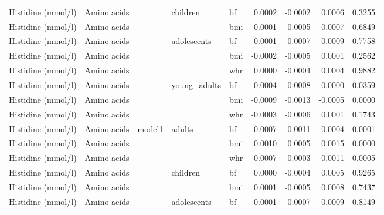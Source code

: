 \documentclass[11pt,twoside]{bristolthesis}
\begin{document}
\begin{longtable}[t]{lllllrrrr}
\cmidrule{1-2}
\cmidrule{5-9}\nopagebreak
Histidine (mmol/l) & Amino acids &  & \multirow{-3}{*}{\raggedright\arraybackslash children} & bf & 0.0002 & -0.0002 & 0.0006 & 0.3255\\
\cmidrule{1-2}
\cmidrule{4-9}\nopagebreak
Histidine (mmol/l) & Amino acids &  &  & bmi & 0.0001 & -0.0005 & 0.0007 & 0.6849\\
\cmidrule{1-2}
\cmidrule{5-9}\nopagebreak
Histidine (mmol/l) & Amino acids &  & \multirow{-2}{*}{\raggedright\arraybackslash adolescents} & bf & 0.0001 & -0.0007 & 0.0009 & 0.7758\\
\cmidrule{1-2}
\cmidrule{4-9}\nopagebreak
Histidine (mmol/l) & Amino acids &  &  & bmi & -0.0002 & -0.0005 & 0.0001 & 0.2562\\
\cmidrule{1-2}
\cmidrule{5-9}\nopagebreak
Histidine (mmol/l) & Amino acids &  &  & whr & 0.0000 & -0.0004 & 0.0004 & 0.9882\\
\cmidrule{1-2}
\cmidrule{5-9}\nopagebreak
Histidine (mmol/l) & Amino acids &  & \multirow{-3}{*}{\raggedright\arraybackslash young\_adults} & bf & -0.0004 & -0.0008 & 0.0000 & 0.0359\\
\cmidrule{1-2}
\cmidrule{4-9}\nopagebreak
Histidine (mmol/l) & Amino acids &  &  & bmi & -0.0009 & -0.0013 & -0.0005 & 0.0000\\
\cmidrule{1-2}
\cmidrule{5-9}\nopagebreak
Histidine (mmol/l) & Amino acids &  &  & whr & -0.0003 & -0.0006 & 0.0001 & 0.1743\\
\cmidrule{1-2}
\cmidrule{5-9}\nopagebreak
Histidine (mmol/l) & Amino acids & \multirow{-11}{*}{\raggedright\arraybackslash model1} & \multirow{-3}{*}{\raggedright\arraybackslash adults} & bf & -0.0007 & -0.0011 & -0.0004 & 0.0001\\
\cmidrule{1-9}\pagebreak[0]
Histidine (mmol/l) & Amino acids &  &  & bmi & 0.0010 & 0.0005 & 0.0015 & 0.0000\\
\cmidrule{1-2}
\cmidrule{5-9}\nopagebreak
Histidine (mmol/l) & Amino acids &  &  & whr & 0.0007 & 0.0003 & 0.0011 & 0.0005\\
\cmidrule{1-2}
\cmidrule{5-9}\nopagebreak
Histidine (mmol/l) & Amino acids &  & \multirow{-3}{*}{\raggedright\arraybackslash children} & bf & 0.0000 & -0.0004 & 0.0005 & 0.9265\\
\cmidrule{1-2}
\cmidrule{4-9}\nopagebreak
Histidine (mmol/l) & Amino acids &  &  & bmi & 0.0001 & -0.0005 & 0.0008 & 0.7437\\
\cmidrule{1-2}
\cmidrule{5-9}\nopagebreak
Histidine (mmol/l) & Amino acids &  & \multirow{-2}{*}{\raggedright\arraybackslash adolescents} & bf & 0.0001 & -0.0007 & 0.0009 & 0.8149\\

\end{longtable}
\end{document}
